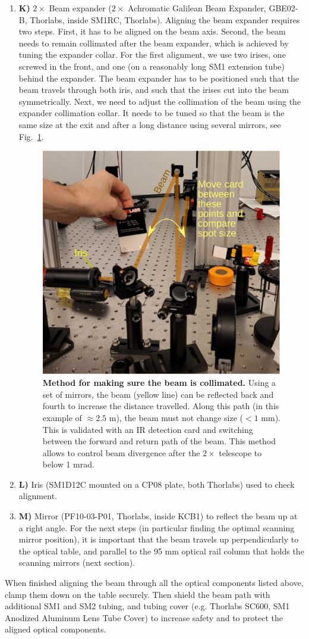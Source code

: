\documentclass[10pt,letterpaper]{article}
\begin{document}
\begin{enumerate}[]
    \item \textbf{K)} $2\times$ Beam expander ($2\times$ Achromatic Galilean Beam Expander, GBE02-B, Thorlabs, inside SM1RC, Thorlabs). Aligning the beam expander requires two steps. First, it has to be aligned on the beam axis. Second, the beam needs to remain collimated after the beam expander, which is achieved by tuning the expander collar. For the first alignment, we use two irises, one screwed in the front, and one (on a reasonably long SM1 extension tube) behind the expander. The beam expander has to be positioned such that the beam travels through both iris, and such that the irises cut into the beam symmetrically. Next, we need to adjust the collimation of the beam using the expander collimation collar. It needs to be tuned so that the beam is the same size at the exit and after a long distance using several mirrors, see Fig.~\ref{sfig3}. 
    \begin{figure}
        \includegraphics[width=.5\textwidth]{sfig3.jpg}
      \caption{{\bf Method for making sure the beam is collimated.} Using a set of mirrors, the beam (yellow line) can be reflected back and fourth to increase the distance travelled. Along this path (in this example of $\approx 2.5\text{ m}$), the beam must not change size ($<1\text{ mm}$). This is validated with an IR detection card and switching between the forward and return path of the beam. This method allows to control beam divergence after the $2\times$ telescope to below 1 mrad.}
      \label{sfig3}
    \end{figure}
\item \textbf{L)} Iris (SM1D12C mounted on a CP08 plate, both Thorlabs) used to check alignment.

\item \textbf{M)} Mirror (PF10-03-P01, Thorlabs, inside KCB1) to reflect the beam up at a right angle. For the next steps (in particular finding the optimal scanning mirror position), it is important that the beam travels up perpendicularly to the optical table, and parallel to the 95 mm optical rail column that holds the scanning mirrors (next section).

\end{enumerate} 
%
When finished aligning the beam through all the optical components listed above, clamp them down on the table securely. Then shield the beam path with additional SM1 and SM2 tubing, and tubing cover (e.g. Thorlabs SC600, SM1 Anodized Aluminum Lens Tube Cover) to increase safety and to protect the aligned optical components.
%
\end{document}
